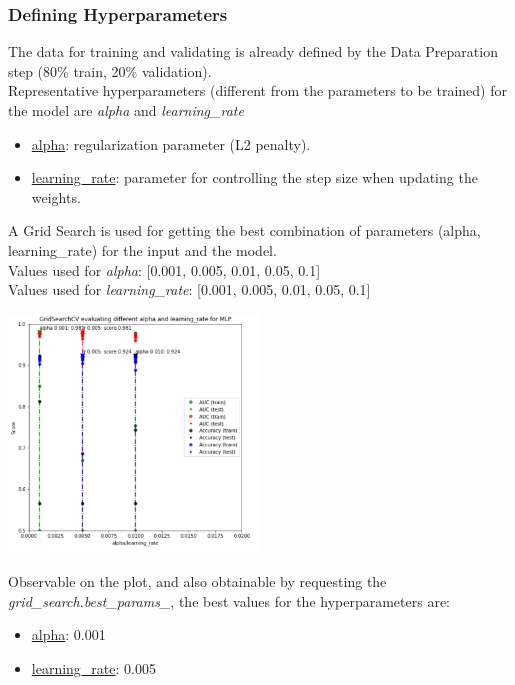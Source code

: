 \subsubsection{Defining Hyperparameters}
The data for training and validating is already defined by the Data Preparation step (80\% train, 20\% validation).\\
Representative hyperparameters (different from the parameters to be trained) for the model are \emph{alpha} and \emph{learning\_rate}
\begin{itemize}
    \item \underline{alpha}: regularization parameter (L2 penalty).
    \item \underline{learning\_rate}: parameter for controlling the step size when updating the weights.
\end{itemize}
A Grid Search is used for getting the best combination of parameters (alpha, learning\_rate) for the input and the model.\\
Values used for \emph{alpha}: [0.001, 0.005, 0.01, 0.05, 0.1]\\
Values used for \emph{learning\_rate}: [0.001, 0.005, 0.01, 0.05, 0.1]
\begin{center}
    \captionsetup{type=figure}
    \includegraphics[width=250px]{grid_search_nn.png}
\end{center}
Observable on the plot, and also obtainable by requesting the \emph{grid\_search.best\_params\_}, the best values for the hyperparameters are:
\begin{itemize}
    \item \underline{alpha}: 0.001
    \item \underline{learning\_rate}: 0.005
\end{itemize}

